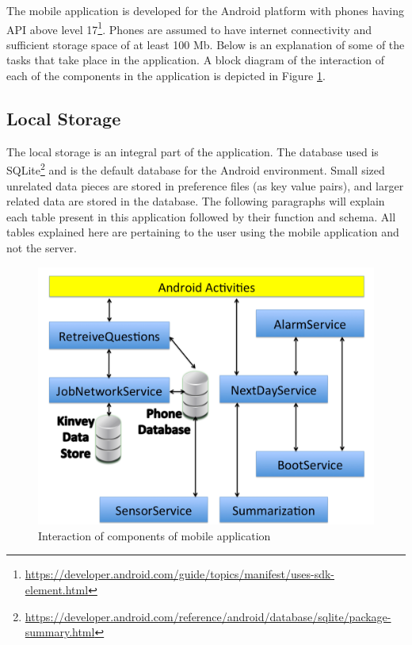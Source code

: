 The mobile application is developed for the Android platform with phones having API above level 17\footnote{\url{https://developer.android.com/guide/topics/manifest/uses-sdk-element.html}}. Phones are assumed to have internet connectivity and sufficient storage space of at least 100 Mb.
Below is an explanation of some of the tasks that take place in the application. A block diagram of the interaction of each of the components in the application is depicted in Figure \ref{fig:chap5_app}.

\subsection{Local Storage} \label{loc}
The local storage is an integral part of the application. The database used is SQLite\footnote{\url{https://developer.android.com/reference/android/database/sqlite/package-summary.html}} and is the default database
for the Android environment. Small sized unrelated data pieces are stored in preference files (as key value pairs), and larger related
data are stored in the database. The following paragraphs will explain each table present in this application followed by
their function and schema. All tables explained here are pertaining to the user using the mobile application and not the server.

\begin{figure}[ht!]
\centering
\includegraphics[width=\textwidth,keepaspectratio]{./images/chap1}
\caption{Interaction of components of mobile application}
\label{fig:chap5_app}
\end{figure}

